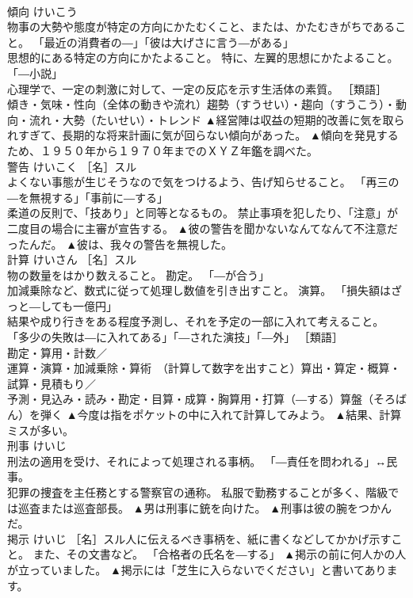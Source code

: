 \documentclass[8pt]{extreport}
\begin{document}
\begin{CJK}{UTF8}{min}
\\	傾向	けいこう	
\\	物事の大勢や態度が特定の方向にかたむくこと、または、かたむきがちであること。 「最近の消費者の―」「彼は大げさに言う―がある」 
\\	思想的にある特定の方向にかたよること。 特に、左翼的思想にかたよること。 「―小説」 
\\	心理学で、一定の刺激に対して、一定の反応を示す生活体の素質。 ［類語］
\\	傾き・気味・性向（全体の動きや流れ）趨勢（すうせい）・趨向（すうこう）・動向・流れ・大勢（たいせい）・トレンド	▲経営陣は収益の短期的改善に気を取られすぎて、長期的な将来計画に気が回らない傾向があった。 ▲傾向を発見するため、１９５０年から１９７０年までのＸＹＺ年鑑を調べた。
\\	警告	けいこく	［名］スル 
\\	よくない事態が生じそうなので気をつけるよう、告げ知らせること。 「再三の―を無視する」「事前に―する」 
\\	柔道の反則で、「技あり」と同等となるもの。 禁止事項を犯したり、「注意」が二度目の場合に主審が宣告する。	▲彼の警告を聞かないなんてなんて不注意だったんだ。 ▲彼は、我々の警告を無視した。
\\	計算	けいさん	［名］スル 
\\	物の数量をはかり数えること。 勘定。 「―が合う」 
\\	加減乗除など、数式に従って処理し数値を引き出すこと。 演算。 「損失額はざっと―しても一億円」 
\\	結果や成り行きをある程度予測し、それを予定の一部に入れて考えること。 「多少の失敗は―に入れてある」「―された演技」「―外」 ［類語］
\\	勘定・算用・計数／
\\	運算・演算・加減乗除・算術　（計算して数字を出すこと）算出・算定・概算・試算・見積もり／
\\	予測・見込み・読み・勘定・目算・成算・胸算用・打算（―する）算盤（そろばん）を弾く	▲今度は指をポケットの中に入れて計算してみよう。 ▲結果、計算ミスが多い。
\\	刑事	けいじ	
\\	刑法の適用を受け、それによって処理される事柄。 「―責任を問われる」↔民事。 
\\	犯罪の捜査を主任務とする警察官の通称。 私服で勤務することが多く、階級では巡査または巡査部長。	▲男は刑事に銃を向けた。 ▲刑事は彼の腕をつかんだ。
\\	掲示	けいじ	［名］スル人に伝えるべき事柄を、紙に書くなどしてかかげ示すこと。 また、その文書など。 「合格者の氏名を―する」	▲掲示の前に何人かの人が立っていました。 ▲掲示には「芝生に入らないでください」と書いてあります。

\end{CJK}
\end{document}
